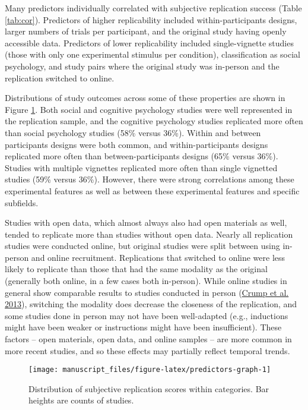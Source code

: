 \documentclass[
  english,
  a4paper,
]{article}
\begin{document}
Many predictors individually correlated with subjective replication success (Table \ref{tab:cor}). Predictors of higher replicability included within-participants designs, larger numbers of trials per participant, and the original study having openly accessible data. Predictors of lower replicability included single-vignette studies (those with only one experimental stimulus per condition), classification as social psychology, and study pairs where the original study was in-person and the replication switched to online.

Distributions of study outcomes across some of these properties are shown in Figure \ref{fig:predictors-graph}. Both social and cognitive psychology studies were well represented in the replication sample, and the cognitive psychology studies replicated more often than social psychology studies (58\% versus 36\%). Within and between participants designs were both common, and within-participants designs replicated more often than between-participants designs (65\% versus 36\%). Studies with multiple vignettes replicated more often than single vignetted studies (59\% versus 36\%). However, there were strong correlations among these experimental features as well as between these experimental features and specific subfields.

Studies with open data, which almost always also had open materials as well, tended to replicate more than studies without open data. Nearly all replication studies were conducted online, but original studies were split between using in-person and online recruitment. Replications that switched to online were less likely to replicate than those that had the same modality as the original (generally both online, in a few cases both in-person). While online studies in general show comparable results to studies conducted in person (\protect\hyperlink{ref-crump2013}{Crump et al. 2013}), switching the modality does decrease the closeness of the replication, and some studies done in person may not have been well-adapted (e.g., inductions might have been weaker or instructions might have been insufficient). These factors -- open materials, open data, and online samples -- are more common in more recent studies, and so these effects may partially reflect temporal trends.

\begin{figure}[ht]
\texttt{[image: manuscript\_files/figure-latex/predictors-graph-1]} \caption{Distribution of subjective replication scores within categories. Bar heights are counts of studies.}\label{fig:predictors-graph}
\end{figure}
\end{document}
